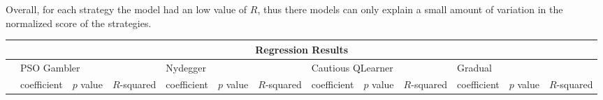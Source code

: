 Overall, for each strategy the model had an low value of \(R\), thus there models
can only explain a small amount of variation in the normalized score of the strategies.
\begin{table}[!hbtp]
	\centering
	\begin{adjustbox}{width=1\textwidth}
		\small
		\begin{tabular}{|l|l|l|l|l|l|l|l|l|l|l|l|l|}
			\hline
			\multicolumn{13}{|c|}{Regression Results}                                                                       \\ \hline
			& \multicolumn{3}{l|}{PSO Gambler} & \multicolumn{3}{l|}{Nydegger} & \multicolumn{3}{l|}{Cautious QLearner} & \multicolumn{3}{l|}{Gradual} \\ \hline
			                           & coefficient  & \(p\) value & \(R\)-squared & coefficient & \(p\) value & \(R\)-squared & coefficient & \(p\) value & \(R\)-squared & coefficient     & \(p\) value & \(R\)-squared \\ \hline


\end{tabular}
\end{adjustbox}
\end{table}
